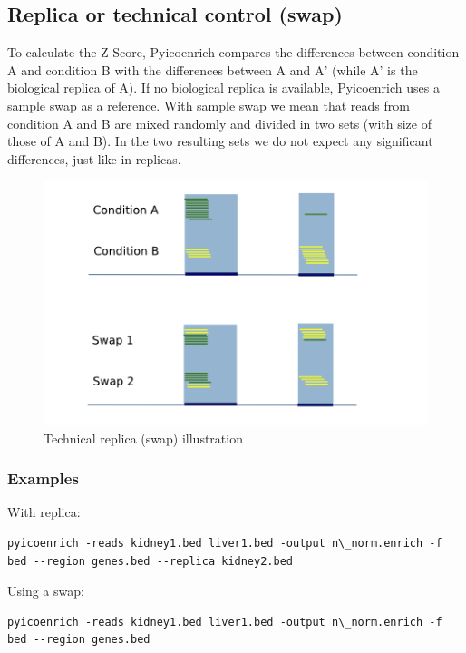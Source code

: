 \documentclass[letterpaper,10pt,english]{sphinxmanual}
\begin{document}
\subsection{Replica or technical control (swap)}
\label{pyicoenrich:replica-or-technical-control-swap}
To calculate the Z-Score, Pyicoenrich compares the differences between condition A and condition B with the differences between A and A' (while A' is the biological replica of A). If no biological replica is available, Pyicoenrich uses a sample swap as a reference. With sample swap we mean that reads from condition A and B are mixed randomly and divided in two sets (with size of those of A and B). In the two resulting sets we do not expect any significant differences, just like in replicas.
\begin{figure}[htbp]
\centering
\capstart

\includegraphics{swap.png}
\caption{Technical replica (swap) illustration}\end{figure}


\subsubsection{Examples}
\label{pyicoenrich:examples}
With replica:

\begin{Verbatim}[commandchars=\\\{\}]
pyicoenrich -reads kidney1.bed liver1.bed -output n\_norm.enrich -f bed --region genes.bed --replica kidney2.bed
\end{Verbatim}

Using a swap:

\begin{Verbatim}[commandchars=\\\{\}]
pyicoenrich -reads kidney1.bed liver1.bed -output n\_norm.enrich -f bed --region genes.bed
\end{Verbatim}
\end{document}
